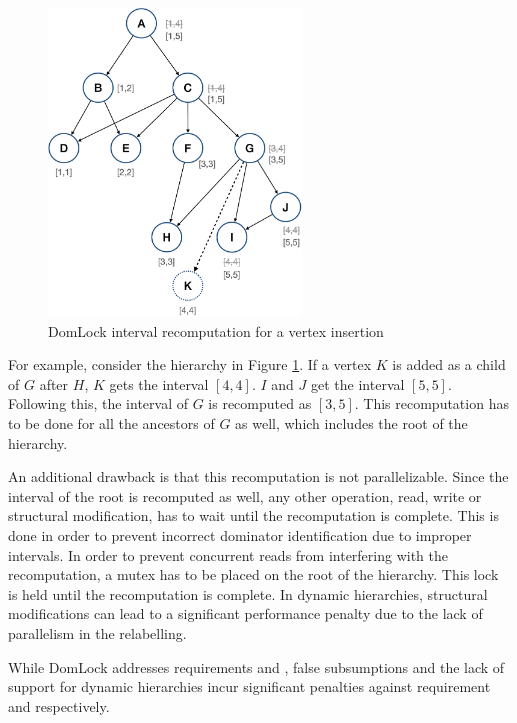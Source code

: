 \begin{figure}[h]
    \centering
    \captionsetup{justification=centering}
    \includegraphics[width=0.6\textwidth]{figures/domlock_example_with_SM.png}
    \caption{DomLock interval recomputation for a vertex insertion}
    \label{fig:domlock_example_SM}
\end{figure}

For example, consider the hierarchy in Figure \ref{fig:domlock_example_SM}. If a vertex $K$ is added as a child of $G$ after $H$, $K$ gets the interval $[4,4]$. $I$ and $J$ get the interval $[5,5]$. Following this, the interval of $G$ is recomputed as $[3,5]$. This recomputation has to be done for all the ancestors of $G$ as well, which includes the root of the hierarchy. 

An additional drawback is that this recomputation is not parallelizable. Since the interval of the root is recomputed as well, any other operation, read, write or structural modification, has to wait until the recomputation is complete. 
This is done in order to prevent incorrect dominator identification due to improper intervals.
In order to prevent concurrent reads from interfering with the recomputation, a mutex has to be placed on the root of the hierarchy. This lock is held until the recomputation is complete. 
In dynamic hierarchies, structural modifications can lead to a significant performance penalty due to the lack of parallelism in the relabelling. 

While DomLock addresses requirements \Ra and \Rb, false subsumptions and the lack of support for dynamic hierarchies incur significant penalties against requirement \Rc and \Rd respectively.



